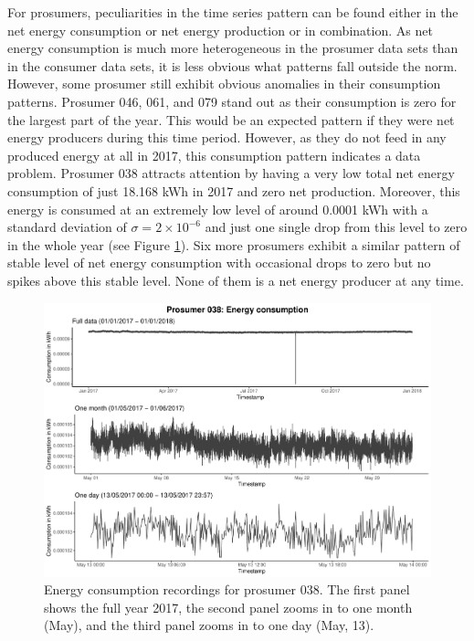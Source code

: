 For prosumers, peculiarities in the time series pattern can be found either in the net energy consumption or net energy production or in combination. As net energy consumption is much more heterogeneous in the prosumer data sets than in the consumer data sets, it is less obvious what patterns fall outside the norm. However, some prosumer still exhibit obvious anomalies in their consumption patterns. Prosumer 046, 061, and 079 stand out as their consumption is zero for the largest part of the year. This would be an expected pattern if they were net energy producers during this time period. However, as they do not feed in any produced energy at all in 2017, this consumption pattern indicates a data problem. 
Prosumer 038 attracts attention by having a very low total net energy consumption of just 18.168 kWh in 2017 and zero net production. Moreover, this energy is consumed at an extremely low level of around 0.0001 kWh with a standard deviation of $\sigma=2\times10^{-6}$ and just one single drop from this level to zero in the whole year (see Figure \ref{Fig:energycons_p038}). Six more prosumers exhibit a similar pattern of stable level of net energy consumption with occasional drops to zero but no spikes above this stable level. None of them is a net energy producer at any time.

\begin{figure}[htbp]
 \centering
\includegraphics[width=\textwidth]{thesis/graphs/timeseries/p038_cons.pdf}
\caption[Energy consumption recordings for prosumer 038]{Energy consumption recordings for prosumer 038. The first panel shows the full year 2017, the second panel zooms in to one month (May), and the third panel zooms in to one day (May, 13). \quantnet}
\label{Fig:energycons_p038}
\end{figure}

